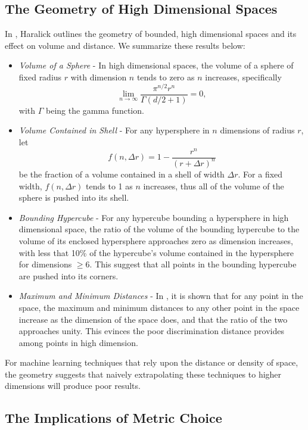 \documentclass{article}
\begin{document}
\subsection{The Geometry of High Dimensional Spaces}
In \cite{haralickgeometryhd}, Haralick outlines the geometry of bounded, high dimensional spaces and its effect on volume and distance. We summarize these results below:
\begin{itemize} 
\item\emph{Volume of a Sphere} - In high dimensional spaces, the volume of a sphere of fixed radius $r$ with dimension $n$ tends to zero as $n$ increases, specifically
$$
\lim_{n\rightarrow\infty}\dfrac{\pi^{n/2}r^n}{\Gamma(d/2+1)}=0,
$$
with $\Gamma$ being the gamma function.
\item \emph{Volume Contained in Shell} - For any hypersphere in $n$ dimensions of radius $r$, let
$$
f(n,\Delta r)=1 -\dfrac{r^n}{(r+\Delta r)^n}
$$
be the fraction of a volume contained in a shell of width $\Delta r$. For a fixed width, $f(n,\Delta r)$ tends to 1 as $n$ increases, thus all of the volume of the sphere is pushed into its shell.
\item\emph{Bounding Hypercube} - For any hypercube bounding a hypersphere in high dimensional space, the ratio of the volume of the bounding hypercube to the volume of its enclosed hypersphere approaches zero as dimension increases, with less that 10\% of the hypercube's volume contained in the hypersphere for dimensions $\geq 6$. This suggest that all points in the bounding hypercube are pushed into its corners. 
\item\emph{Maximum and Minimum Distances} - In \cite{haralicknn}, it is shown that for any point in the space, the maximum and minimum distances to any other point in the space increase as the dimension of the space does, and that the ratio of the two approaches unity.  This evinces the poor discrimination distance provides among points in high dimension.
\end{itemize}
For machine learning techniques that rely upon the distance or density of space, the geometry suggests that naively extrapolating these techniques to higher dimensions will produce poor results.
\subsection{The Implications of Metric Choice}
\end{document}
